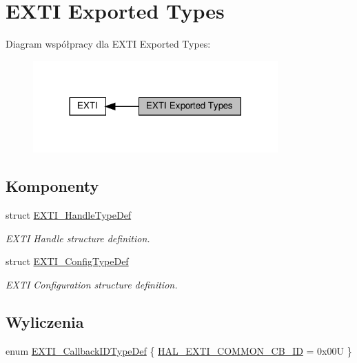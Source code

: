 \hypertarget{group___e_x_t_i___exported___types}{}\section{E\+X\+TI Exported Types}
\label{group___e_x_t_i___exported___types}
Diagram współpracy dla E\+X\+TI Exported Types\+:\nopagebreak
\begin{figure}[H]
\begin{center}
\leavevmode
\includegraphics[width=266pt]{group___e_x_t_i___exported___types}
\end{center}
\end{figure}
\subsection*{Komponenty}
\begin{DoxyCompactItemize}
\item 
struct \hyperlink{struct_e_x_t_i___handle_type_def}{E\+X\+T\+I\+\_\+\+Handle\+Type\+Def}
\begin{DoxyCompactList}\small\item\em E\+X\+TI Handle structure definition. \end{DoxyCompactList}\item 
struct \hyperlink{struct_e_x_t_i___config_type_def}{E\+X\+T\+I\+\_\+\+Config\+Type\+Def}
\begin{DoxyCompactList}\small\item\em E\+X\+TI Configuration structure definition. \end{DoxyCompactList}\end{DoxyCompactItemize}
\subsection*{Wyliczenia}
\begin{DoxyCompactItemize}
\item 
enum \hyperlink{group___e_x_t_i___exported___types_ga0ff36e8796a6ad3f2fc211e534c54c0e}{E\+X\+T\+I\+\_\+\+Callback\+I\+D\+Type\+Def} \{ \hyperlink{group___e_x_t_i___exported___types_gga0ff36e8796a6ad3f2fc211e534c54c0ea9e0259c6eb4e5da890544489f133294b}{H\+A\+L\+\_\+\+E\+X\+T\+I\+\_\+\+C\+O\+M\+M\+O\+N\+\_\+\+C\+B\+\_\+\+ID} = 0x00U
 \}
\end{DoxyCompactItemize}


